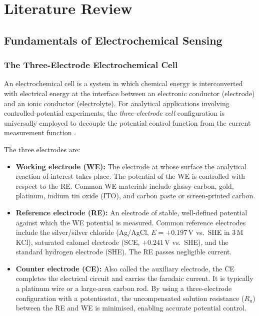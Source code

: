 \chapter{Literature Review}
\label{ch:litreview}

\section{Fundamentals of Electrochemical Sensing}
\label{sec:electrochemistry_fundamentals}

\subsection{The Three-Electrode Electrochemical Cell}
\label{subsec:three_electrode}

An electrochemical cell is a system in which chemical energy is interconverted with electrical energy at the interface between an electronic conductor (electrode) and an ionic conductor (electrolyte). For analytical applications involving controlled-potential experiments, the \textit{three-electrode cell} configuration is universally employed to decouple the potential control function from the current measurement function \cite{Bard2001}.

The three electrodes are:
\begin{itemize}
    \item \textbf{Working electrode (WE):} The electrode at whose surface the analytical reaction of interest takes place. The potential of the WE is controlled with respect to the RE. Common WE materials include glassy carbon, gold, platinum, indium tin oxide (ITO), and carbon paste or screen-printed carbon.
    \item \textbf{Reference electrode (RE):} An electrode of stable, well-defined potential against which the WE potential is measured. Common reference electrodes include the silver/silver chloride (Ag/AgCl, $E = +0.197$\,V vs.\ SHE in 3\,M KCl), saturated calomel electrode (SCE, $+0.241$\,V vs.\ SHE), and the standard hydrogen electrode (SHE). The RE passes negligible current.
    \item \textbf{Counter electrode (CE):} Also called the auxiliary electrode, the CE completes the electrical circuit and carries the faradaic current. It is typically a platinum wire or a large-area carbon rod. By using a three-electrode configuration with a potentiostat, the uncompensated solution resistance ($R_\mathrm{u}$) between the RE and WE is minimised, enabling accurate potential control.
\end{itemize}


